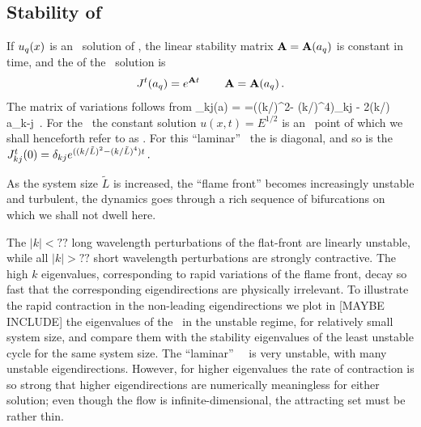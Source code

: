 \subsection{Stability of \eqva}
\label{s:StabEqui}

If $u_q(x)$ is an \eqv\ solution of \KSe,
the linear stability matrix
${\bf A}={\bf A}(a_q)$
is constant in time,
and  
the {\jacobianM}
of the \eqv\ solution is
\[
 {J}^t(a_q) = e^{{\bf A} t}
    \,\qquad
 {\bf \ensuremath{A}}={\bf A}(a_q)
\,.
\]
The matrix of variations
follows from 
\beq
{\Mvar}_{kj}(a) =
=((k/)^2- (k/)^4)\delta_{kj} - 2(k/) a_{k-j}
\,.
For the \KSe\ the constant solution $u(x,t)= E^{1/2}$ is an 
\eqv\ point of  which we shall henceforth refer to as
. For this ``laminar'' \eqv\ the {\stabmat}
is diagonal, and 
so is the {\jacobianM}
$
{J}^t_{kj}(0) = \delta_{kj} e^{((k/\tilde{L})^2- (k/\tilde{L})^4)t}
\,.
$

As the system size $\tilde{L}$  is increased,
the ``flame front'' becomes increasingly unstable and turbulent,
the dynamics goes through a rich sequence of
bifurcations on which we shall not dwell here.

The $|k|<??$ 
long wavelength perturbations of the flat-front {\eqv}
are linearly unstable, while all 
$|k|> ??$ short wavelength perturbations are strongly contractive.  
The high $k$ eigenvalues, corresponding to rapid variations of
the flame front, decay so fast that the corresponding eigendirections
are physically irrelevant.
To illustrate the rapid contraction in the non-leading eigendirections
we plot  in [MAYBE INCLUDE] %
the eigenvalues of the \eqv\ in the unstable regime,
for relatively small system size, %
and compare them with the
stability eigenvalues of the least unstable cycle for the same 
system size.
The ``laminar'' ~\eqv\ is very unstable,
with many unstable eigendirections. 
However, for higher eigenvalues the rate of contraction
is so strong that higher eigendirections are numerically meaningless for 
either solution; even though the flow is infinite-dimensional, the attracting
set must be rather thin.


